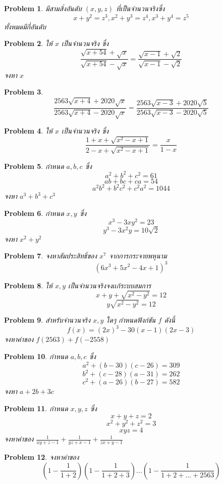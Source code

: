 \documentclass[a4paper,12pt]{article}
\newtheorem{problem}{Problem}
\begin{document}
	\begin{problem}
		มีสามสิ่งอันดับ $(x,y,z)$ ที่เป็นจำนวนจริงซึ่ง 
		$$ x+y^2=z^3,x^2+y^3=z^4, x^3+y^4=z^5 $$ ทั้งหมดมีกี่อันดับ
	\end{problem}
	\begin{problem}
		ให้ $x$ เป็นจำนวนจริง ซึ่ง $$\frac{\sqrt{x+54}+\sqrt{x}}{\sqrt{x+54}-\sqrt{x}} = \frac{\sqrt{x-1}+\sqrt{2}}{\sqrt{x-1}-\sqrt{2}}$$ จงหา $x$
	\end{problem}
	\begin{problem}
		$$\frac{2563\sqrt{x+4}+2020\sqrt{x}}{2563\sqrt{x+4}-2020\sqrt{x}}=\frac{2563\sqrt{x-3}+2020\sqrt{5}}{2563\sqrt{x-3}-2020\sqrt{5}}$$
	\end{problem}
	\begin{problem}
		ให้ $x$ เป็นจำนวนจริง ซึ่ง 
		$$ \frac{1+x+\sqrt{x^2-x+1}}{2-x+\sqrt{x^2-x+1}}=\frac{x}{1-x}$$
	\end{problem}
	\begin{problem}
		กำหนด $a,b,c$ ซึ่ง
		 $$ a^2+b^2+c^2 = 61 $$
		 $$ab+bc+ca  =54$$
		 $$a^2b^2+b^2c^2+c^2a^2 = 1044$$
		 จงหา $a^3+b^3+c^3$
	\end{problem}
	\begin{problem}
		กำหนด $x,y$ ซึ่ง
		$$x^3-3xy^2=23$$
		$$y^3-3x^2y=10\sqrt{2}$$
		จงหา $x^2+y^2$
	\end{problem}
	\begin{problem}
		จงหาสัมประสิทธิ์ของ $x^7$ จากการกระจายพหุนาม 
		$$(6x^3+5x^2-4x+1)^3$$
	\end{problem}
	\begin{problem}
		ให้ $x,y$ เป็นจำนวนจริงจงเเก้ระบบสมการ
		$$x+y+\sqrt{x^2-y^2}=12$$
		$$y\sqrt{x^2-y^2}=12$$
	\end{problem}
	\begin{problem}
		สำหรับจำนวนจริง $x,y$ ใดๆ กำหนดฟังก์ชัน $f$ ดังนี้
		$$f(x)=(2x)^3-30(x-1)(2x-3)$$
		จงหาค่าของ $f(2563)+f(-2558)$
	\end{problem}
	\begin{problem}
		กำหนด $a,b,c$ ซึ่ง
		$$a^2+(b-30)(c-26)=309$$
		$$b^2+(c-28)(a-31)=262$$
		$$c^2+(a-26)(b-27)=582$$
		จงหา $a+2b+3c$
	\end{problem}
	\begin{problem}
		กำหนด $x,y,z$ ซึ่ง
		$$x+y+z=2$$
		$$x^2+y^2+z^2=3$$
		$$xyz=4$$
		จงหาค่าของ $\frac{1}{xy+z-1}+\frac{1}{yz+x-1}+\frac{1}{zx+y-1}$
	\end{problem}
	\begin{problem}
		จงหาค่าของ $$(1-\frac{1}{1+2})(1-\frac{1}{1+2+3})...(1-\frac{1}{1+2+...+2563})$$
	\end{problem}
\end{document}
